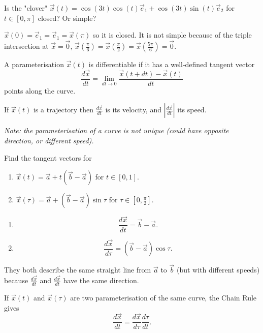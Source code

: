 \documentclass[10pt, a4paper]{article}
\begin{document}
\begin{example}
    Is the "clover" $\vec{x}(t) = \cos(3t)\cos(t)\vec{e}_1 + \cos(3t)\sin(t)\vec{e}_2$ for $t \in [0, \pi]$ closed? Or simple?

    \begin{solution}
        $\vec{x}(0) = \vec{e}_1 = \vec{e}_1 = \vec{x}(\pi)$ so it is closed.
        It is not simple because of the triple intersection at $\vec{x} = \vec{0}$,
        $\vec{x}\left(\frac{\pi}{6}\right) = \vec{x}\left(\frac{\pi}{2}\right) = \vec{x}\left(\frac{5\pi}{6}\right) = \vec{0}$.
    \end{solution}
\end{example}

A parameterisation $\vec{x}(t)$ is differentiable if it has a well-defined tangent vector
\[
\frac{d\vec{x}}{dt} = \lim_{dt \to 0}\frac{\vec{x}(t + dt) - \vec{x}(t)}{dt}
\]
points along the curve.

If $\vec{x}(t)$ is a trajectory then $\frac{d\vec{x}}{dt}$ is its velocity,
and $\left|\frac{d\vec{x}}{dt}\right|$ its speed.

\textit{Note:
the parameterisation of a curve is not unique
(could have opposite direction,
or different speed).}

\begin{example}
    Find the tangent vectors for
    \begin{enumerate}[label = (\roman*)]
        \item $\vec{x}(t) = \vec{a} + t(\vec{b} - \vec{a})$ for $t \in [0, 1]$.

        \item $\vec{x}(\tau) = \vec{a} + (\vec{b} - \vec{a})\sin{\tau}$ for $\tau \in \left[0, \frac{\pi}{2}\right]$.
    \end{enumerate}

    \begin{solution}
        \begin{enumerate}[label = (\roman*)]
            \item
            \[
            \frac{d\vec{x}}{dt} = \vec{b} - \vec{a}.
            \]

            \item
            \[
            \frac{d\vec{x}}{d\tau} = (\vec{b} - \vec{a})\cos{\tau}.
            \]
        \end{enumerate}

        They both describe the same straight line from $\vec{a}$ to $\vec{b}$
        (but with different speeds)
        because $\frac{d\vec{x}}{dt}$ and $\frac{d\vec{x}}{dt}$ have the same direction.

        If $\vec{x}(t)$ and $\vec{x}(\tau)$ are two parameterisation of the same curve,
        the Chain Rule gives
        \[
        \frac{d\vec{x}}{dt} = \frac{d\vec{x}}{d\tau}\frac{d\tau}{dt}.
        \]
    \end{solution}
\end{example}
\end{document}
